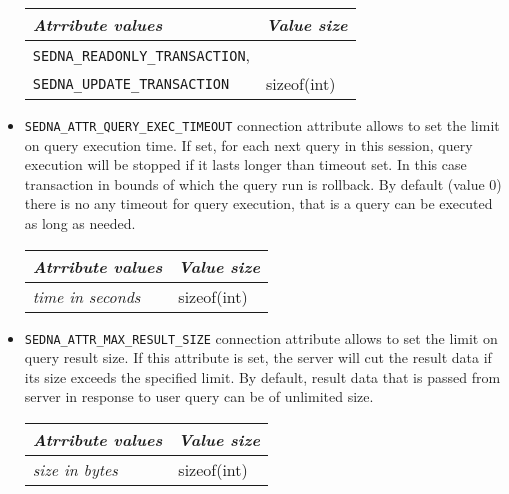\documentclass[a4paper,12pt]{article}
\begin{document}
\begin{itemize}
\begin{tabular}{|l|l|}
\hline
\emph{Atrribute values} & \emph{Value size} \\
\hline
\verb!SEDNA_READONLY_TRANSACTION!, & \\
\verb!SEDNA_UPDATE_TRANSACTION! & sizeof(int) \\
\hline
\end{tabular}

\item\verb!SEDNA_ATTR_QUERY_EXEC_TIMEOUT! connection attribute allows to set the
limit on query execution time. If set, for each next query in this session,
query execution will be stopped if it lasts longer than timeout set. In this
case transaction in bounds of which the query run is rollback. By default (value
0) there is no any timeout for query execution, that is a query can be executed
as long as needed.

\begin{tabular}{|l|l|}
\hline
\emph{Atrribute values} & \emph{Value size} \\
\hline
\emph{time in seconds} & sizeof(int) \\
\hline
\end{tabular}

\item\verb!SEDNA_ATTR_MAX_RESULT_SIZE! connection attribute allows to set the
limit on query result size. If this attribute is set, the server will cut the
result data if its size exceeds the specified limit. By default, result data
that is passed from server in response to user query can be of unlimited size.

\begin{tabular}{|l|l|}
\hline
\emph{Atrribute values} & \emph{Value size} \\
\hline
\emph{size in bytes} & sizeof(int) \\
\hline
\end{tabular}


\end{itemize}
\end{document}
